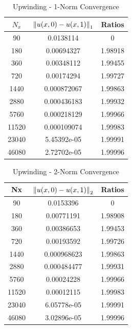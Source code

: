 \documentclass[12pt]{article}
\begin{document}
\begin{enumerate}[(a)]
\begin{minipage}{0.5\textwidth}
\begin{table}[H]
\caption{Upwinding - 1-Norm Convergence}
\centering\begin{tabular}{||c|cc||}
\hline \hline
    $N_x$ &   $\norm{u(x,0)-u(x,1)}_1$ &   Ratios \\
\hline
    90 &    0.0138114   &  0       \\
   180 &    0.00694327  &  1.98918 \\
   360 &    0.00348112  &  1.99455 \\
   720 &    0.00174294  &  1.99727 \\
  1440 &    0.000872067 &  1.99863 \\
  2880 &    0.000436183 &  1.99932 \\
  5760 &    0.000218129 &  1.99966 \\
 11520 &    0.000109074 &  1.99983 \\
 23040 &    5.45392e-05 &  1.99991 \\
 46080 &    2.72702e-05 &  1.99996 \\
\hline \hline
\end{tabular}
\end{table}
\end{minipage}%
\begin{minipage}{0.5\textwidth}
\begin{table}[H]
\caption{Upwinding - 2-Norm Convergence}
\centering\begin{tabular}{||c|cc||}
\hline \hline
    Nx &   $\norm{u(x,0)-u(x,1)}_2$ &   Ratios \\
\hline
    90 &    0.0153396   &  0       \\
   180 &    0.00771191  &  1.98908 \\
   360 &    0.00386653  &  1.99453 \\
   720 &    0.00193592  &  1.99726 \\
  1440 &    0.000968623 &  1.99863 \\
  2880 &    0.000484477 &  1.99931 \\
  5760 &    0.00024228  &  1.99966 \\
 11520 &    0.00012115  &  1.99983 \\
 23040 &    6.05778e-05 &  1.99991 \\
 46080 &    3.02896e-05 &  1.99996 \\
\hline \hline
\end{tabular}
\end{table}
\end{minipage}
\begin{minipage}{0.5\textwidth}
\begin{table}[H]

\end{table}
\end{minipage}
\end{enumerate}
\end{document}
